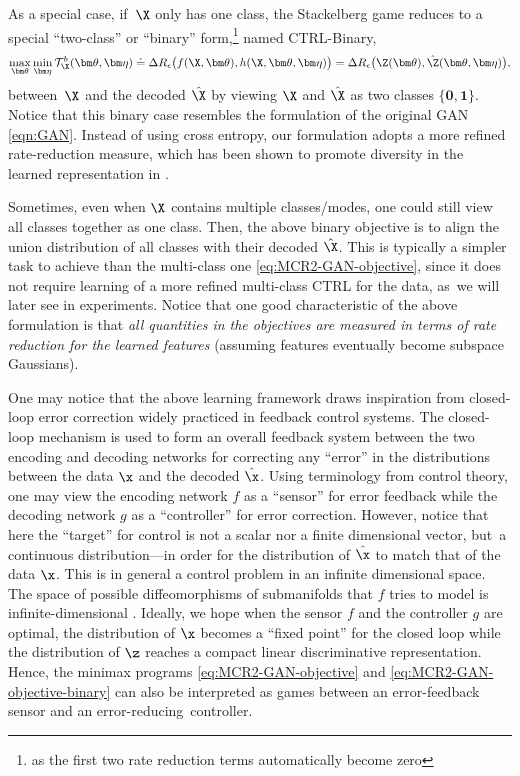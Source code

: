 \documentclass[../../book-main.tex]{subfiles}
\begin{document}
As a special case, if~$\X$ only has one class, the Stackelberg game reduces to a special ``two-class'' or ``binary''  form,\footnote{as the first two rate reduction terms automatically become zero} named CTRL-Binary, 
\begin{equation}
 \max_{\bm \theta} \min_{\bm \eta} \mathcal{T}^b_{\X}(\bm \theta, \bm \eta) \doteq \Delta R_\epsilon\big(f(\X,\bm \theta), h(\X,\bm \theta,\bm \eta)\big) = \Delta R_\epsilon\big(\Z(\bm \theta), \hat \Z(\bm \theta, \bm \eta)\big), 
    \label{eq:MCR2-GAN-objective-binary}
\end{equation}
between~$\X$ and the decoded $\hat\X$ by viewing $\X$ and $\hat \X$ as two classes $\{\bm 0, \bm 1\}$. Notice that this binary case resembles the formulation of the original GAN \eqref{eqn:GAN}. Instead of using cross entropy, our formulation adopts a more refined rate-reduction measure, which has been shown to promote diversity in the learned representation in . %

Sometimes, even when $\X$ contains multiple classes/modes, one could still view all classes together as one class. Then, the above binary objective is to align the union distribution of all classes with their decoded $\hat \X$. This is typically a simpler task to achieve than the multi-class one \eqref{eq:MCR2-GAN-objective}, since it does not require learning of a more refined multi-class CTRL for the data, as~we will later see in experiments. Notice that one good characteristic of the above formulation is that {\em all quantities in the objectives are measured in terms of rate reduction for the learned features} (assuming features eventually become subspace Gaussians). 

One may notice that the above learning framework draws inspiration from closed-loop error correction widely practiced in feedback control systems. The closed-loop mechanism is used to form an overall feedback system between the two encoding and decoding networks for correcting any  ``error'' in the distributions between the data $\x$ and the decoded $\hat \x$. Using terminology from control theory, one may view the encoding network $f$ as a ``sensor'' for error feedback while the decoding network $g$ as a ``controller'' for error correction. However, notice that here the ``target'' for control is not a scalar nor a finite dimensional vector, but~a continuous distribution---in order for the distribution of $\hat \x$ to match that of the data $\x$. This is in general a control problem in an infinite dimensional space. The space of possible diffeomorphisms of submanifolds that $f$ tries to model is infinite-dimensional \cite{Lee2002IntroductionTS}. Ideally, we hope when the sensor $f$ and the controller $g$ are optimal, the distribution of $\x$ becomes a ``fixed point'' for the closed loop while the distribution of $\z$ reaches a compact linear discriminative representation. Hence, the minimax programs \eqref{eq:MCR2-GAN-objective} and \eqref{eq:MCR2-GAN-objective-binary} can also be interpreted as games between an error-feedback sensor and an error-reducing~controller.
\end{document}
